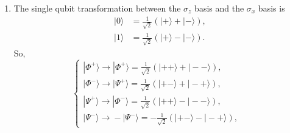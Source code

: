 \documentclass[english,aps,onecolumn]{revtex4-1}
\begin{document}
\begin{enumerate}[1.]
\begin{enumerate}[(1)]
\begin{equation}
\begin{split}
\begin{array}{ll}
             \xrightarrow{\sigma_y\otimes I}  i|\Psi^+\rangle, & \\
             \xrightarrow{\sigma_z\otimes I}  |\Phi^+\rangle, &
          \end{array}
        \right.               \\
 \Psi^+ &\left\{
          \begin{array}{ll}
             \xrightarrow{\sigma_x\otimes I}  |\Phi^+\rangle, &  \\
             \xrightarrow{\sigma_y\otimes I}  -i|\Phi^-\rangle, & \\
             \xrightarrow{\sigma_z\otimes I}  |\Psi^-\rangle, &
          \end{array}
        \right.               \\
\Psi^- &\left\{
          \begin{array}{ll}
             \xrightarrow{\sigma_x\otimes I}  -|\Phi^-\rangle, &  \\
             \xrightarrow{\sigma_y\otimes I} i|\Phi^+\rangle, & \\
             \xrightarrow{\sigma_z\otimes I}  |\Psi^+\rangle, &
          \end{array}
        \right.
             \end{split}
             \end{equation}
   \item The single qubit transformation between the $\sigma_z$ basis and the $\sigma_x$ basis is
    \begin{equation}
      \begin{split}
        |0\rangle & =\frac{1}{\sqrt{2}}(|+\rangle+|-\rangle),\\
        |1\rangle & =\frac{1}{\sqrt{2}}(|+\rangle-|-\rangle).
      \end{split}
    \end{equation}
   So,
   \begin{equation}
   \left\{
     \begin{array}{ll}
         |\Phi^+\rangle \xrightarrow{}  |\Phi^+\rangle=\frac{1}{\sqrt{2}}(|++\rangle+|--\rangle), &  \\
         |\Phi^-\rangle \xrightarrow{}  |\Psi^+\rangle=\frac{1}{\sqrt{2}}(|+-\rangle+|-+\rangle), &  \\
         |\Psi^+\rangle \xrightarrow{}  |\Phi^-\rangle=\frac{1}{\sqrt{2}}(|++\rangle-|--\rangle), &  \\
         |\Psi^-\rangle \xrightarrow{}  -|\Psi^-\rangle=-\frac{1}{\sqrt{2}}(|+-\rangle-|-+\rangle), &
     \end{array}
   \right.
   \end{equation}
   \end{enumerate}


\end{enumerate}
\end{document}
